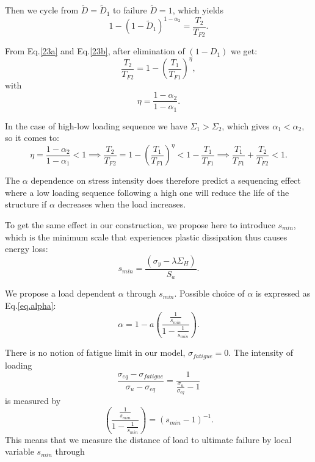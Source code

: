 Then we cycle from  ${\tilde D}={\tilde D}_1$ to failure ${\tilde D}=1$, which yields
\begin{equation}
1-\left( 1-\tilde{D}_1\right)^{1-\alpha_2}=\dfrac{T_2}{T_{F2}}.
\label{23b}
\end{equation}

From Eq.\eqref{23a} and Eq.\eqref{23b}, after elimination of $\left( 1-D_1\right)$ we get:
\begin{equation} 
\dfrac{T_2}{T_{F2}} =1-\left( \dfrac{T_1}{T_{F1}}\right) ^\eta,
\label{eq.sequence}
\end{equation}
with
\begin{equation}
\eta=\dfrac{1-\alpha_2}{1-\alpha_1}.
\label{eq.eta}
\end{equation}

In the case of high-low loading sequence we have $\Sigma_1>\Sigma_2$,  which gives $\alpha_1<\alpha_2$, so it comes to:
$$\eta=\frac{1-\alpha_2}{1-\alpha_1}<1 \implies
\frac{T_2}{T_{F2}}=1-\left( \frac{T_1}{T_{F1}}\right) ^\eta<1-\frac{T_1}{T_{F1}} \implies
\frac{T_1}{T_{F1}}+\frac{T_2}{T_{F2}}<1.$$

The $\alpha$ dependence on stress intensity does therefore predict a sequencing effect where a low loading sequence following a high one will reduce the life of the structure if $\alpha$ decreases when the load increases.

To get the same effect in our construction, we propose here to introduce $s_{min}$, which is the minimum scale that experiences plastic dissipation thus causes energy loss:
\begin{equation}
s_{min}=\dfrac{\left(\sigma_y-\lambda \Sigma_H\right)}{S_{a}}.
\label{eq.smin}
\end{equation}

We propose a load dependent $\alpha$ through $s_{min}$. Possible choice
of $\alpha$ is expressed as Eq.\eqref{eq.alpha}:
\begin{equation}
\alpha=1-a\left( \dfrac{\frac{1}{s_{min}}}{1-\frac{1}{s_{min}}} \right) .
\label{eq.alpha}
\end{equation}

There is no notion of fatigue limit in our model, $\sigma_{fatigue}=0$. The intensity of loading
$$\frac{ \sigma_{eq}-\sigma_{fatigue}}{ \sigma_{u} - \sigma_{eq}}= \frac{ 1}{\frac{\sigma_{u}}{\sigma_{eq}} -1}$$
is measured by 
$$\left( \dfrac{\frac{1}{s_{min}}}{1-\frac{1}{s_{min}}}\right) =\left(s_{min}-1 \right) ^{-1}.$$
This means that we measure the distance of load to ultimate failure by local variable $s_{min}$ through 

